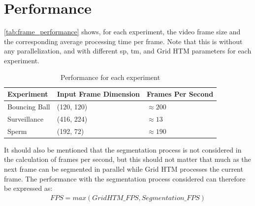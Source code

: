 \section{Performance}
\autoref{tab:frame_performance} shows, for each experiment, the video frame size and the corresponding average processing time per frame. Note that this is without any parallelization, and with different \gls*{sp}, \gls*{tm}, and Grid HTM parameters for each experiment.
\begin{table}[H]
    \centering
    \begin{tabularx}{\linewidth}{@{}XlX@{}}
        \toprule
        \textbf{Experiment} & \textbf{Input Frame Dimension} & \textbf{Frames Per Second} \\
        \midrule
        Bouncing Ball       & (120, 120)                     & $\approx 200$              \\
        Surveillance        & (416, 224)                     & $\approx 13$               \\
        Sperm               & (192, 72)                      & $\approx 190$              \\
        \bottomrule
    \end{tabularx}
    \caption{Performance for each experiment}
    \label{tab:frame_performance}
\end{table}
It should also be mentioned that the segmentation process is not considered in the calculation of frames per second, but this should not matter that much as the next frame can be segmented in parallel while Grid HTM processes the current frame. The performance with the segmentation process considered can therefore be expressed as:
\begin{align*}
    FPS=max(GridHTM\_FPS, Segmentation\_FPS)
\end{align*}
